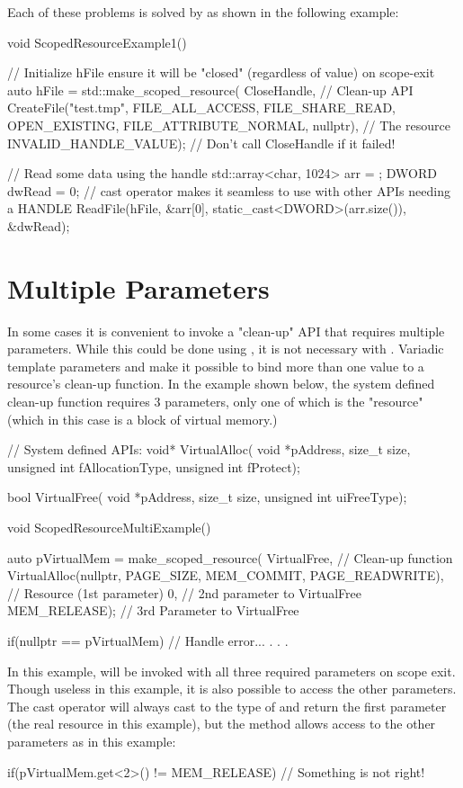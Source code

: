 \documentclass[ebook,11pt,article]{memoir}
\begin{document}
Each of these problems is solved by  as shown in the following example:

\begin{codeblock}
void ScopedResourceExample1()
{
	// Initialize hFile ensure it will be "closed" (regardless of value) on scope-exit
	auto hFile = std::make_scoped_resource(
		CloseHandle,				// Clean-up API
		CreateFile("test.tmp", 
			FILE_ALL_ACCESS, 
			FILE_SHARE_READ, 
			OPEN_EXISTING, 
			FILE_ATTRIBUTE_NORMAL,
			nullptr), 			// The resource
		INVALID_HANDLE_VALUE);	// Don't call CloseHandle if it failed!

	// Read some data using the handle
	std::array<char, 1024> arr = { };
	DWORD dwRead = 0;
	// cast operator makes it seamless to use with other APIs needing a HANDLE
	ReadFile(hFile,
		&arr[0], 
		static_cast<DWORD>(arr.size()), 
		&dwRead);
}
\end{codeblock}

\section{Multiple Parameters}
In some cases it is convenient to invoke a "clean-up" API that requires multiple parameters.  While this could be done using , it is not necessary with .  Variadic template parameters and  make it possible to bind more than one value to a resource's clean-up function.  In the example shown below, the system defined clean-up function  requires 3 parameters, only one of which is the "resource" (which in this case is a block of virtual memory.)

\begin{codeblock}
// System defined APIs:
void* VirtualAlloc(
    void *pAddress,
    size_t size,
    unsigned int fAllocationType,
    unsigned int fProtect);

bool VirtualFree(
    void *pAddress,
    size_t size,
    unsigned int uiFreeType);

void ScopedResourceMultiExample()
{
	auto pVirtualMem = make_scoped_resource(
		VirtualFree,			// Clean-up function
		VirtualAlloc(nullptr,
			PAGE_SIZE,
			MEM_COMMIT,
			PAGE_READWRITE),	// Resource (1st parameter)
		0,				// 2nd parameter to VirtualFree
		MEM_RELEASE);			// 3rd Parameter to VirtualFree

	if(nullptr == pVirtualMem)
	{
		// Handle error...
	}
	.
	.
	.
}
\end{codeblock}
In this example,  will be invoked with all three required parameters on scope exit.  Though useless in this example, it is also possible to access the other parameters.  The cast operator will always cast to the type of and return the first parameter (the real resource in this example), but the  method allows access to the other parameters as in this example:
\begin{codeblock}


if(pVirtualMem.get<2>() != MEM_RELEASE)
{
	// Something is not right!
}
\end{codeblock}
\end{document}

